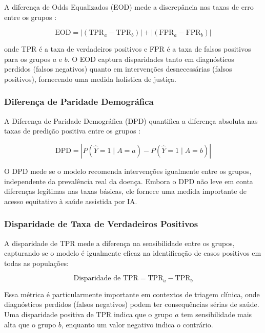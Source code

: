 A diferença de Odds Equalizados (EOD) mede a discrepância nas taxas de 
erro entre os grupos \cite{hardt2016}:

\begin{equation}
\text{EOD} = |(\text{TPR}_a - \text{TPR}_b)| + |(\text{FPR}_a - \text{FPR}_b)|
\label{eq:eod}
\end{equation}

\noindent onde TPR é a taxa de verdadeiros positivos e FPR é a taxa de 
falsos positivos para os grupos $a$ e $b$. O EOD captura disparidades 
tanto em diagnósticos perdidos (falsos negativos) quanto em intervenções 
desnecessárias (falsos positivos), fornecendo uma medida holística de 
justiça.

\subsubsection{Diferença de Paridade Demográfica}

A Diferença de Paridade Demográfica (DPD) quantifica a diferença absoluta 
nas taxas de predição positiva entre os grupos \cite{dwork2012}:

\begin{equation}
\text{DPD} = |P(\hat{Y}=1 \mid A=a) - P(\hat{Y}=1 \mid A=b)|
\label{eq:dpd}
\end{equation}

O DPD mede se o modelo recomenda intervenções igualmente entre os grupos, 
independente da prevalência real da doença. Embora o DPD não leve em conta 
diferenças legítimas nas taxas básicas, ele fornece uma medida importante 
de acesso equitativo à saúde assistida por IA.

\subsubsection{Disparidade de Taxa de Verdadeiros Positivos}

A disparidade de TPR mede a diferença na sensibilidade entre os grupos, 
capturando se o modelo é igualmente eficaz na identificação de casos 
positivos em todas as populações:

\begin{equation}
\text{Disparidade de TPR} = \text{TPR}_a - \text{TPR}_b
\label{eq:tpr_disparity}
\end{equation}

Essa métrica é particularmente importante em contextos de triagem clínica, 
onde diagnósticos perdidos (falsos negativos) podem ter consequências 
sérias de saúde. Uma disparidade positiva de TPR indica que o grupo $a$ 
tem sensibilidade mais alta que o grupo $b$, enquanto um valor negativo 
indica o contrário.

